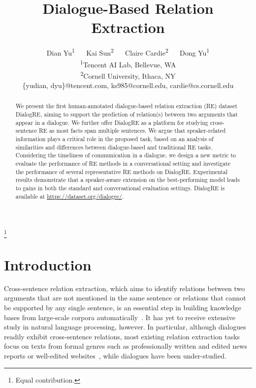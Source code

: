 \documentclass[11pt,a4paper]{article}
\title{Dialogue-Based Relation Extraction}
\author{
  Dian Yu\textsuperscript{1}\textsuperscript{\dag}  ~~ Kai Sun\textsuperscript{2}\textsuperscript{\dag} ~~ Claire Cardie\textsuperscript{2} ~~ Dong Yu\textsuperscript{1}\\
 \textsuperscript{1}Tencent AI Lab, Bellevue, WA\\
 \textsuperscript{2}Cornell University, Ithaca, NY \\
   \{yudian, dyu\}@tencent.com, ks985@cornell.edu,  cardie@cs.cornell.edu \\
}
\date{}
\newcommand\blfootnote[1]{\begingroup
  \renewcommand\thefootnote{}\footnote{#1}\addtocounter{footnote}{-1}\endgroup
}
\begin{document}
\maketitle                          

\blfootnote{ Equal contribution.}

\begin{abstract}

We present the first human-annotated dialogue-based relation extraction (RE) dataset DialogRE, aiming to support the prediction of relation(s) between two arguments that appear in a dialogue. We further offer DialogRE as a platform for studying cross-sentence RE as most facts span multiple sentences. We argue that speaker-related information plays a critical role in the proposed task, based on an analysis of similarities and differences between dialogue-based and traditional RE tasks. Considering the timeliness of communication in a dialogue, we design a new metric to evaluate the performance of RE methods in a conversational setting and investigate the performance of several representative RE methods on DialogRE. Experimental results demonstrate that a speaker-aware extension on the best-performing model leads to gains in both the standard and conversational evaluation settings. DialogRE is available at \url{https://dataset.org/dialogre/}.




\end{abstract}


 \section{Introduction}

Cross-sentence relation extraction, which aims to identify relations between two arguments that are not mentioned in the same sentence or relations that cannot be supported by any single sentence, is an essential step in building knowledge bases from large-scale corpora automatically~\cite{ji2010overview,swampillai-stevenson-2010-inter,surdeanu2013overview}. It has yet to receive extensive study in natural language processing, however. In particular, although dialogues readily exhibit cross-sentence relations, most existing relation extraction tasks focus on texts from formal genres such as professionally written and edited news reports or well-edited websites~\cite{elsahar2018t,yao2019docred,mesquita-etal-2019-knowledgenet,grishman2019twenty}, while dialogues have been under-studied.
\end{document}
